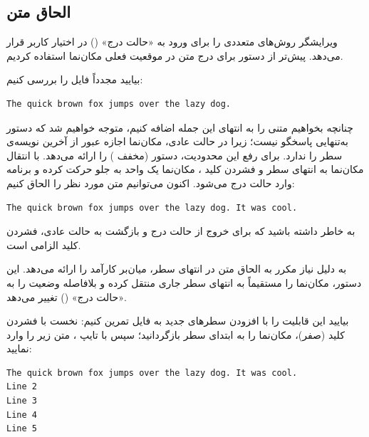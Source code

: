 \subsection{الحاق متن}

ویرایشگر  روش‌های متعددی را برای ورود به «حالت درج» () در اختیار کاربر قرار می‌دهد. پیش‌تر از دستور  برای درج متن در موقعیت فعلی مکان‌نما استفاده کردیم.

بیایید مجدداً فایل  را بررسی کنیم:

\begin{latin}
\begin{lstlisting}
The quick brown fox jumps over the lazy dog.
\end{lstlisting}
\end{latin}

چنانچه بخواهیم متنی را به انتهای این جمله اضافه کنیم، متوجه خواهیم شد که دستور  به‌تنهایی پاسخگو نیست؛ زیرا در حالت عادی، مکان‌نما اجازه عبور از آخرین نویسه‌ی سطر را ندارد. برای رفع این محدودیت،  دستور  (مخفف ) را ارائه می‌دهد. با انتقال مکان‌نما به انتهای سطر و فشردن کلید ، مکان‌نما یک واحد به جلو حرکت کرده و برنامه وارد حالت درج می‌شود. اکنون می‌توانیم متن مورد نظر را الحاق کنیم:

\begin{latin}
\begin{lstlisting}
The quick brown fox jumps over the lazy dog. It was cool.
\end{lstlisting}
\end{latin}

به خاطر داشته باشید که برای خروج از حالت درج و بازگشت به حالت عادی، فشردن کلید  الزامی است.

به دلیل نیاز مکرر به الحاق متن در انتهای سطر،  میان‌بر کارآمد  را ارائه می‌دهد. این دستور، مکان‌نما را مستقیماً به انتهای سطر جاری منتقل کرده و بلافاصله وضعیت را به «حالت درج» () تغییر می‌دهد.

بیایید این قابلیت را با افزودن سطرهای جدید به فایل تمرین کنیم: نخست با فشردن کلید  (صفر)، مکان‌نما را به ابتدای سطر بازگردانید؛ سپس با تایپ ، متن زیر را وارد نمایید:

\begin{latin}
\begin{lstlisting}
The quick brown fox jumps over the lazy dog. It was cool.
Line 2
Line 3
Line 4
Line 5
\end{lstlisting}
\end{latin}

